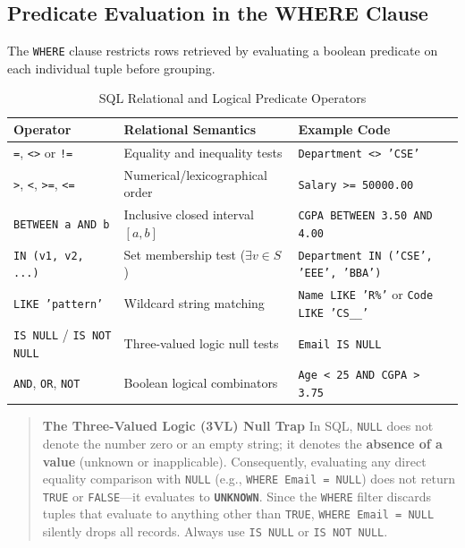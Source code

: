\subsection{Predicate Evaluation in the WHERE Clause}
The \texttt{WHERE} clause restricts rows retrieved by evaluating a boolean predicate on each individual tuple before grouping.
\begin{table}[htbp]
\centering
\small
\caption{SQL Relational and Logical Predicate Operators}
\label{tab:sql_where_operators}
\begin{tabularx}{\textwidth}{l p{4.5cm} X}
\toprule
\textbf{Operator} & \textbf{Relational Semantics} & \textbf{Example Code} \\
\midrule
\texttt{=}, \texttt{<>} or \texttt{!=} & Equality and inequality tests & \texttt{Department <> 'CSE'} \\
\texttt{>}, \texttt{<}, \texttt{>=}, \texttt{<=} & Numerical/lexicographical order & \texttt{Salary >= 50000.00} \\
\texttt{BETWEEN a AND b} & Inclusive closed interval $[a, b]$ & \texttt{CGPA BETWEEN 3.50 AND 4.00} \\
\texttt{IN (v1, v2, ...)} & Set membership test ($\exists v \in S$) & \texttt{Department IN ('CSE', 'EEE', 'BBA')} \\
\texttt{LIKE 'pattern'} & Wildcard string matching & \texttt{Name LIKE 'R\%'} or \texttt{Code LIKE 'CS\_\_'} \\
\texttt{IS NULL} / \texttt{IS NOT NULL} & Three-valued logic null tests & \texttt{Email IS NULL} \\
\texttt{AND}, \texttt{OR}, \texttt{NOT} & Boolean logical combinators & \texttt{Age < 25 AND CGPA > 3.75} \\
\bottomrule
\end{tabularx}
\end{table}

\begin{quote}
\textbf{The Three-Valued Logic (3VL) Null Trap}
In SQL, \texttt{NULL} does not denote the number zero or an empty string; it denotes the \textbf{absence of a value} (unknown or inapplicable). Consequently, evaluating any direct equality comparison with \texttt{NULL} (e.g., \texttt{WHERE Email = NULL}) does not return \texttt{TRUE} or \texttt{FALSE}---it evaluates to \textbf{\texttt{UNKNOWN}}. Since the \texttt{WHERE} filter discards tuples that evaluate to anything other than \texttt{TRUE}, \texttt{WHERE Email = NULL} silently drops all records. Always use \texttt{IS NULL} or \texttt{IS NOT NULL}.
\end{quote}

